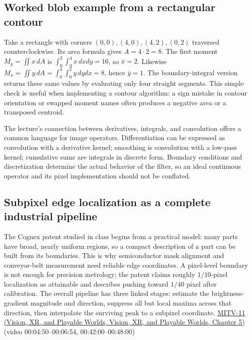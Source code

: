 \subsection{Worked blob example from a rectangular contour}\label{04-visual-computing-ii-ch030-worked-blob-example-from-a-rectangular-contour}

Take a rectangle with corners \((0,0),(4,0),(4,2),(0,2)\) traversed counterclockwise. Its area formula gives \(A=4\cdot2=8\). The first moment \(M_y=\iint x\,dA\) is \(\int_0^2\int_0^4x\,dxdy=16\), so \(\bar{x}=2\). Likewise \(M_x=\iint y\,dA=\int_0^4\int_0^2y\,dydx=8\), hence \(\bar{y}=1\). The boundary-integral version returns these same values by evaluating only four straight segments. This simple check is useful when implementing a contour algorithm: a sign mistake in contour orientation or swapped moment names often produces a negative area or a transposed centroid.

The lecture's connection between derivatives, integrals, and convolution offers a common language for image operators. Differentiation can be expressed as convolution with a derivative kernel; smoothing is convolution with a low-pass kernel; cumulative sums are integrals in discrete form. Boundary conditions and discretization determine the actual behavior of the filter, so an ideal continuous operator and its pixel implementation should not be conflated.

\subsection{Subpixel edge localization as a complete industrial pipeline}\label{04-visual-computing-ii-ch030-subpixel-edge-localization-as-a-complete-industrial-pipeline}

The Cognex patent studied in class begins from a practical model: many parts have broad, nearly uniform regions, so a compact description of a part can be built from its boundaries. This is why semiconductor mask alignment and conveyor-belt measurement need reliable edge coordinates. A pixel-level boundary is not enough for precision metrology; the patent claims roughly \(1/10\)-pixel localization as attainable and describes pushing toward \(1/40\) pixel after calibration. The overall pipeline has three linked stages: estimate the brightness-gradient magnitude and direction, suppress all but local maxima across that direction, then interpolate the surviving peak to a subpixel coordinate. \href{../07-Vision-XR-and-Playable-Worlds/main.pdf\#nameddest=04-visual-computing-ii-ch036-mitv-11---edge-detection-subpixel-position-cordic-line-detection-us-6408109}{MITV-11 (Vision, XR, and Playable Worlds, Vision, XR, and Playable Worlds, Chapter 5)} (video 00:04:50--00:06:54, 00:42:00--00:48:00)

